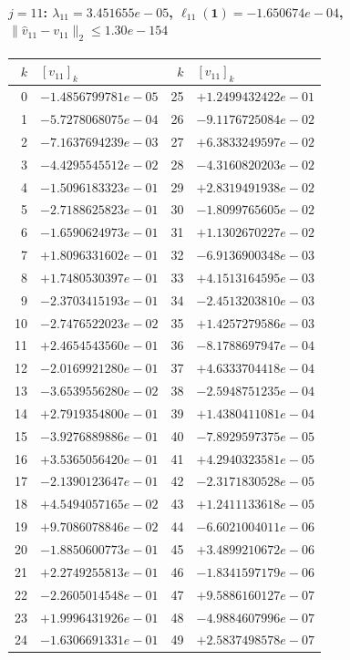 \documentclass[11pt]{article}
\begin{document}
\paragraph{$j = 11$: $\lambda_{11} = 3.451655e-05$, \quad $\ell_{11}(\mathbf{1}) = -1.650674e-04$, \quad $\|\hat{v}_{11} - v_{11}\|_2 \leq 1.30e-154$}
\begin{center}
{\footnotesize
\begin{tabular}{r@{\;\;}l@{\quad}r@{\;\;}l}
\toprule
$k$ & $[v_{11}]_k$ & $k$ & $[v_{11}]_k$ \\
\midrule
0 & $-1.4856799781e-05$ & 25 & $+1.2499432422e-01$ \\
1 & $-5.7278068075e-04$ & 26 & $-9.1176725084e-02$ \\
2 & $-7.1637694239e-03$ & 27 & $+6.3833249597e-02$ \\
3 & $-4.4295545512e-02$ & 28 & $-4.3160820203e-02$ \\
4 & $-1.5096183323e-01$ & 29 & $+2.8319491938e-02$ \\
5 & $-2.7188625823e-01$ & 30 & $-1.8099765605e-02$ \\
6 & $-1.6590624973e-01$ & 31 & $+1.1302670227e-02$ \\
7 & $+1.8096331602e-01$ & 32 & $-6.9136900348e-03$ \\
8 & $+1.7480530397e-01$ & 33 & $+4.1513164595e-03$ \\
9 & $-2.3703415193e-01$ & 34 & $-2.4513203810e-03$ \\
10 & $-2.7476522023e-02$ & 35 & $+1.4257279586e-03$ \\
11 & $+2.4654543560e-01$ & 36 & $-8.1788697947e-04$ \\
12 & $-2.0169921280e-01$ & 37 & $+4.6333704418e-04$ \\
13 & $-3.6539556280e-02$ & 38 & $-2.5948751235e-04$ \\
14 & $+2.7919354800e-01$ & 39 & $+1.4380411081e-04$ \\
15 & $-3.9276889886e-01$ & 40 & $-7.8929597375e-05$ \\
16 & $+3.5365056420e-01$ & 41 & $+4.2940323581e-05$ \\
17 & $-2.1390123647e-01$ & 42 & $-2.3171830528e-05$ \\
18 & $+4.5494057165e-02$ & 43 & $+1.2411133618e-05$ \\
19 & $+9.7086078846e-02$ & 44 & $-6.6021004011e-06$ \\
20 & $-1.8850600773e-01$ & 45 & $+3.4899210672e-06$ \\
21 & $+2.2749255813e-01$ & 46 & $-1.8341597179e-06$ \\
22 & $-2.2605014548e-01$ & 47 & $+9.5886160127e-07$ \\
23 & $+1.9996431926e-01$ & 48 & $-4.9884607996e-07$ \\
24 & $-1.6306691331e-01$ & 49 & $+2.5837498578e-07$ \\
\bottomrule
\end{tabular}
}
\end{center}
\end{document}
